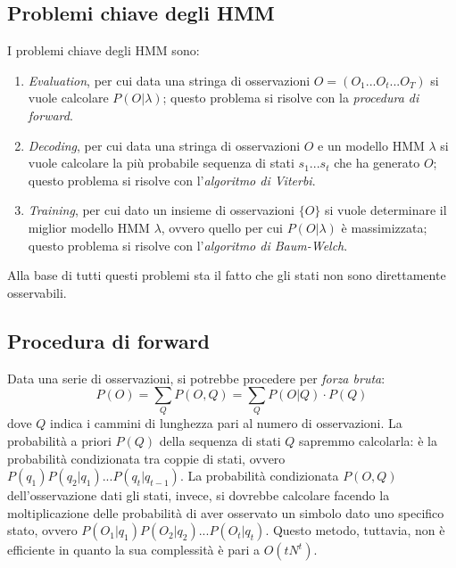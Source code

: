 \documentclass[a4paper,oneside,titlepage]{book}
\begin{document}
\subsection{Problemi chiave degli HMM}
I problemi chiave degli HMM sono:
\begin{enumerate}
    \item \textit{Evaluation}, per cui data una stringa di osservazioni $O=(O_1...O_t...O_T)$ si vuole calcolare $P(O|\lambda)$; questo problema si risolve con la \textit{procedura di forward}.
    \item \textit{Decoding}, per cui data una stringa di osservazioni $O$ e un modello HMM $\lambda$ si vuole calcolare la più probabile sequenza di stati $s_1...s_t$ che ha generato $O$; questo problema si risolve con l'\textit{algoritmo di Viterbi}.
    \item \textit{Training}, per cui dato un insieme di osservazioni $\{O\}$ si vuole determinare il miglior modello HMM $\lambda$, ovvero quello per cui $P(O|\lambda)$ è massimizzata; questo problema si risolve con l'\textit{algoritmo di Baum-Welch}.
\end{enumerate}
Alla base di tutti questi problemi sta il fatto che gli stati non sono direttamente osservabili.

\subsection{Procedura di forward}
\label{forward}
Data una serie di osservazioni, si potrebbe procedere per \textit{forza bruta}:
\[ P(O) = \sum_Q P(O,Q) = \sum_Q P(O|Q) \cdot P(Q) \]
dove $Q$ indica i cammini di lunghezza pari al numero di osservazioni. La probabilità a priori $P(Q)$ della sequenza di stati $Q$ sapremmo calcolarla: è la probabilità condizionata tra coppie di stati, ovvero $P(q_1) P(q_2|q_1) ... P(q_t|q_{t-1})$. La probabilità condizionata $P(O,Q)$ dell'osservazione dati gli stati, invece, si dovrebbe calcolare facendo la moltiplicazione delle probabilità di aver osservato un simbolo dato uno specifico stato, ovvero $P(O_1|q_1) P(O_2|q_2) ... P(O_t|q_t)$. Questo metodo, tuttavia, non è efficiente in quanto la sua complessità è pari a $O(tN^t)$.
\end{document}
